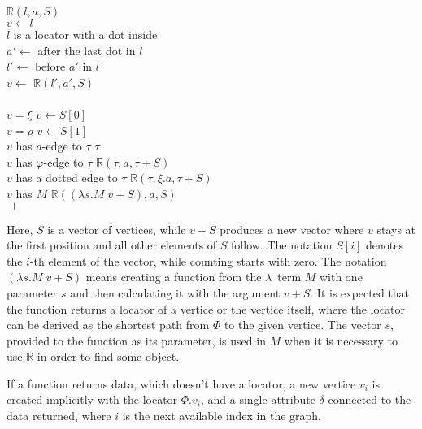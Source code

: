 \begin{twocols}
\begin{algo}
 $\mathbb{R}(l,a,S)$ \\
  \tab $v \gets l$ \\
  \tab {} $l$ is a locator with a dot inside \\
  \tab\tab $a' \gets$ after the last dot in $l$ \\
  \tab\tab $l' \gets$ before $a'$ in $l$ \\
  \tab\tab $v \gets$ $\mathbb{R}(l', a', S)$ \\
  \tab {} \\
  \tab {} $v = \xi$  $v \gets S[0]$ \\
  \tab {} $v = \rho$  $v \gets S[1]$ \\
  \tab {} $v$ has $a$-edge to $\tau$   $\tau$ \\
  \tab {} $v$ has $\varphi$-edge to $\tau$   $\mathbb{R}(\tau, a, \tau + S)$ \\
  \tab {} $v$ has a dotted edge to $\tau$   $\mathbb{R}(\tau, \xi.a, \tau + S)$ \\
  \tab {} $v$ has $M$   $\mathbb{R}((\lambda s.M \; v + S), a, S)$ \\
  \tab {} $\perp$ \\
\end{algo}
\end{twocols}

Here, $S$ is a vector of vertices, while $v+S$ produces a new vector
where $v$ stays at the first position and all other elements of $S$ follow.
The notation $S[i]$ denotes the $i$-th element of the vector, while
counting starts with zero.
The notation $(\lambda s.M \; v + S)$ means creating a function from
the $\lambda$~term $M$ with one parameter $s$ and then calculating
it with the argument $v + S$.
It is expected that the function returns a locator of a vertice or
the vertice itself, where the locator can be derived as
the shortest path from $\Phi$ to the given vertice.
The vector $s$, provided to the
function as its parameter, is used in $M$ when it is necessary
to use $\mathbb{R}$ in order to find some object.

If a function returns data, which doesn't have a locator, a new vertice
$v_i$ is created implicitly with the locator $\Phi.v_i$, and
a single attribute $\delta$ connected to the data returned, where
$i$ is the next available index in the graph.

